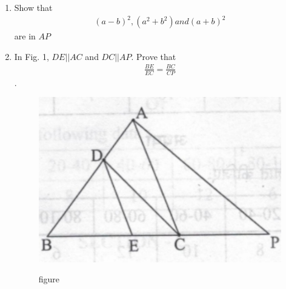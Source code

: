 \documentclass[12pt,-letter paper]{article}
\begin{document}
\begin{enumerate}
	\item Show that \begin{align}(a-b)^2,(a^2+b^2) and (a+b)^2\end{align} are in $AP$
		\item In Fig. 1, $DE|| AC$ and $DC|| AP$. Prove that \begin{align}\frac{BE}{EC} =
		\frac{BC}{CP}\end{align}.
		\begin{figure}[H]
		\includegraphics[width=\columnwidth]{./imagecharan1.jpg}
		\label{fig:fig1}
		\caption{figure}
		\end{figure}



\end{enumerate}
\end{document}
